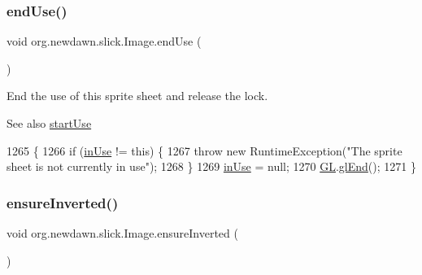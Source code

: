\subsubsection{\texorpdfstring{end\+Use()}{endUse()}}
{\footnotesize\ttfamily void org.\+newdawn.\+slick.\+Image.\+end\+Use (\begin{DoxyParamCaption}{ }\end{DoxyParamCaption})\hspace{0.3cm}{\ttfamily [inline]}}

End the use of this sprite sheet and release the lock.

\begin{DoxySeeAlso}{See also}
\mbox{\hyperlink{classorg_1_1newdawn_1_1slick_1_1_image_a6c7c3f31d0a0a4c73026c8dac8dec7d2}{start\+Use}} 
\end{DoxySeeAlso}

\begin{DoxyCode}
1265                          \{
1266         \textcolor{keywordflow}{if} (\mbox{\hyperlink{classorg_1_1newdawn_1_1slick_1_1_image_a2a474928fc97b6caec518f7eb6e553e6}{inUse}} != \textcolor{keyword}{this}) \{
1267             \textcolor{keywordflow}{throw} \textcolor{keyword}{new} RuntimeException(\textcolor{stringliteral}{"The sprite sheet is not currently in use"});
1268         \}
1269         \mbox{\hyperlink{classorg_1_1newdawn_1_1slick_1_1_image_a2a474928fc97b6caec518f7eb6e553e6}{inUse}} = null;
1270         \mbox{\hyperlink{classorg_1_1newdawn_1_1slick_1_1_image_aafbab31355bec79e747f477e970dcda4}{GL}}.\mbox{\hyperlink{interfaceorg_1_1newdawn_1_1slick_1_1opengl_1_1renderer_1_1_s_g_l_a7f5666aaa59b12617ab81e1263140f72}{glEnd}}();
1271     \}
\end{DoxyCode}
\mbox{\label{classorg_1_1newdawn_1_1slick_1_1_image_a7587492a98997703485233d2feed2339}} 
\subsubsection{\texorpdfstring{ensure\+Inverted()}{ensureInverted()}}
{\footnotesize\ttfamily void org.\+newdawn.\+slick.\+Image.\+ensure\+Inverted (\begin{DoxyParamCaption}{ }\end{DoxyParamCaption})\hspace{0.3cm}{\ttfamily [inline]}}

